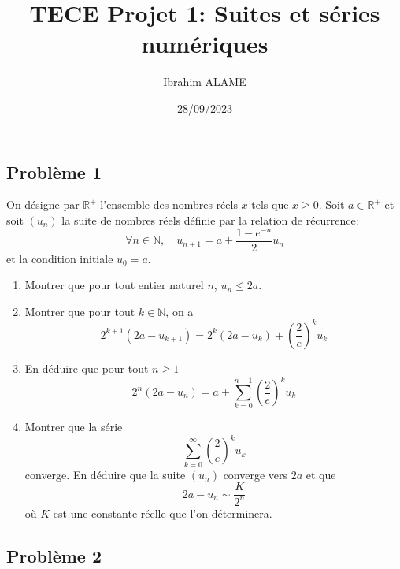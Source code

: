 \documentclass{article}
\title{TECE Projet 1: Suites et séries numériques}
\author{Ibrahim ALAME}
\date{28/09/2023}
\begin{document}
  \lstset{
    frame       = single,
    numbers     = left,
    showspaces  = false,
    showstringspaces    = false,
    captionpos  = t,
    caption     = \lstname
}
\maketitle
\begin{center}
\end{center}
\subsection*{Problème 1}
On désigne par $\mathbb{R}^+$ l'ensemble des nombres réels $x$ tels que $x\geq 0$. Soit $a\in \mathbb{R}^+$ et soit $(u_n)$ la suite de nombres réels définie par la relation de récurrence:
\[\forall n\in \mathbb{N},\quad u_{n+1}=a+\frac{1-e^{-n}}{2}u_n\]
et la condition initiale $u_0=a$.
\begin{enumerate}
\item Montrer que pour tout entier naturel $n$, $u_n\leq 2a$.
\item Montrer que pour tout $k\in \mathbb{N}$, on a
\[2^{k+1}(2a-u_{k+1})=2^k(2a-u_k)+\left(\frac{2}{e}\right)^ku_k\]
\item En déduire que pour tout $n\geq 1$
\[2^n(2a-u_n)=a+\sum_{k=0}^{n-1}\left(\frac{2}{e}\right)^ku_k\]
\item Montrer que la série \[\sum_{k=0}^\infty\left(\frac{2}{e}\right)^ku_k\] converge. En déduire que la suite $(u_n)$ converge vers $2a$ et que \[2a-u_n\sim \frac{K}{2^n}\] où $K$ est une constante réelle que l'on déterminera.
\end{enumerate}

\subsection*{Problème 2}
\end{document}
